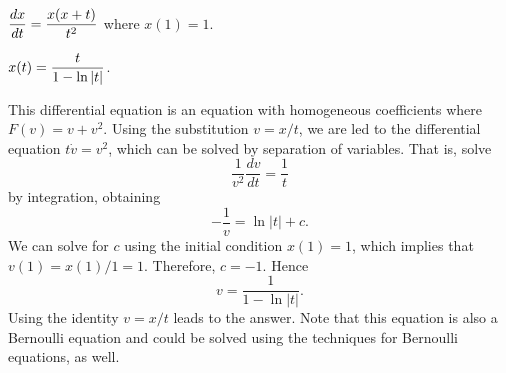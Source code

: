 \documentclass{ximera}
\begin{document}
\begin{exercise} \label{c14.5.9}
$\displaystyle \frac{dx}{dt} = \frac{x(x+t)}{t^2}$ where $x(1)=1$.

\begin{solution}
\ans $x(t) = \displaystyle\frac{t}{1-\ln|t|}$.

\soln  This differential equation is an equation with homogeneous
coefficients where $F(v) = v + v^2$.  Using the substitution $v=x/t$, we
are led to the differential equation $t\dot{v}=v^2$, which can be solved
by separation of variables.  That is, solve
\[
 \frac{1}{v^2} \frac{dv}{dt} = \frac{1}{t}
\]
by integration, obtaining
\[
-\frac{1}{v} = \ln|t| + c.
\]
We can solve for $c$ using the initial condition $x(1)=1$, which implies
that $v(1)=x(1)/1=1$.  Therefore, $c=-1$.  Hence
\[
v = \frac{1}{1-\ln|t|}.
\]
Using the identity $v=x/t$ leads to the answer.   Note that this equation is
also a Bernoulli equation and could be solved using the techniques for
Bernoulli equations, as well.

\end{solution}
\end{exercise}
\end{document}
